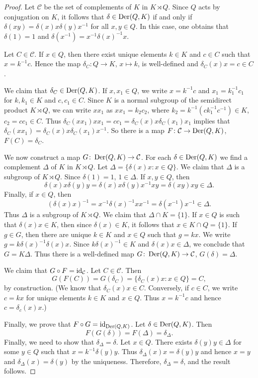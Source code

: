 \begin{proof}
    Let $\mathcal{C}$ be the set of complements of $K$ in $K\rtimes Q$. 
	Since $Q$ acts by conjugation on $K$, it follows that $\delta\in\operatorname{Der}(Q,K)$ if and only if 
	$\delta(xy)=\delta(x)x\delta(y)x^{-1}$ for all $x,y\in Q$. In this case, 
	one obtains that 
	$\delta(1)=1$ and $\delta(x^{-1})=x^{-1}\delta(x)^{-1}x$.
	
	Let 
	$C\in\mathcal{C}$. If $x\in Q$, then there exist unique elements  
	$k\in K$ and $c\in C$ such that $x=k^{-1}c$. Hence the  map 
	$\delta_C\colon Q\to K$, $x\mapsto k$, is well-defined and 
	$\delta_C(x)x=c\in C$. 
	
	We claim that $\delta_C\in\operatorname{Der}(Q,K)$. If $x,x_1\in Q$, we write $x=k^{-1}c$
	and $x_1=k_1^{-1}c_1$ for $k,k_1\in K$ and $c,c_1\in C$. Since $K$ is a normal subgroup of 
	the semidirect product $K\rtimes Q$, we can write $xx_1$ as $xx_1=k_2c_2$, where 
	$k_2=k^{-1}(ck_1^{-1}c^{-1})\in K$, $c_2=cc_1\in C$. Thus  
	$\delta_C(xx_1)xx_1=cc_1=\delta_C(x)x\delta_C(x_1)x_1$ 
	implies that $\delta_C(xx_1)=\delta_C(x)x\delta_C(x_1)x^{-1}$. 
	So there is a map $F\colon\mathcal{C}\to\operatorname{Der}(Q,K)$, $F(C)=\delta_C$.

	We now construct a map $G\colon\operatorname{Der}(Q,K)\to\mathcal{C}$. 
	For each 
	$\delta\in\operatorname{Der}(Q,K)$ we find a complement $\Delta$ of $K$ in $K\rtimes Q$. Let 
	$\Delta=\{\delta(x)x:x\in Q\}$. 
	We claim that $\Delta$ is a subgroup of $K\rtimes Q$. Since $\delta(1)=1$,
	$1\in \Delta$. If $x,y\in Q$, then 
	\[
	\delta(x)x\delta(y)y=\delta(x)x\delta(y)x^{-1}xy=\delta(xy)xy\in \Delta.
	\]
	Finally, if $x\in Q$, then 
	\[
	(\delta(x)x)^{-1}=x^{-1}\delta(x)^{-1}xx^{-1}=\delta(x^{-1})x^{-1}\in \Delta.
	\]
	Thus $\Delta$ is a subgroup of $K\rtimes Q$.
	We claim that $\Delta\cap K=\{1\}$. If $x\in Q$ is such that $\delta(x)x\in K$, then 
    since $\delta(x)\in K$, it follows that $x\in K\cap Q=\{1\}$. If $g\in G$, then 
	there are unique $k\in K$ and $x\in Q$ such that $g=kx$. We write 
	$g=k\delta(x)^{-1}\delta(x)x$. Since $k\delta(x)^{-1}\in K$ and $\delta(x)x\in
	\Delta$, we conclude that $G=K\Delta$. Thus there is a well-defined map 
	$G\colon\operatorname{Der}(Q,K)\to\mathcal{C}$, $G(\delta)=\Delta$.

	We claim that $G\circ F=\operatorname{id}_{\mathcal{C}}$. 
	Let $C\in\mathcal{C}$. Then  
	\[
	G(F(C))=G(\delta_C)=\{\delta_C(x)x:x\in
	Q\}=C,
	\]
	by construction. (We know that $\delta_C(x)x\in C$. Conversely, if $c\in
	C$, we write $c=kx$ for unique elements $k\in K$ and $x\in Q$. Thus $x=k^{-1}c$
	and hence $c=\delta_c(x)x$.)

	Finally, we prove that $F\circ G=\operatorname{id}_{\operatorname{Der}(Q,K)}$. Let $\delta\in\operatorname{Der}(Q,K)$.
    Then	
    \[
	F(G(\delta))=F(\Delta)=\delta_{\Delta}.
	\]
	Finally, we need to show that $\delta_\Delta=\delta$.  Let $x\in Q$. There exists 
	$\delta(y)y\in\Delta$ for some $y\in Q$ such that $x=k^{-1}\delta(y)y$.
	Thus $\delta_{\Delta}(x)x=\delta(y)y$ and hence $x=y$ and $\delta_{\Delta}(x)=\delta(y)$ by
	the uniqueness. Therefore, $\delta_{\Delta}=\delta$, and the result follows. 
\end{proof}

